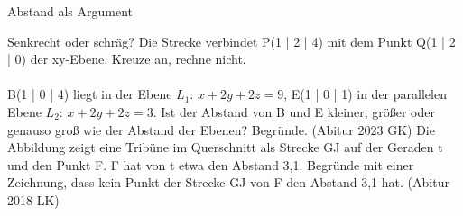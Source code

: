 \setcounter{aufgabe}{15}

\begin{aufgabe}{Abstand als Argument}
\begin{teile}
\teil Senkrecht oder schräg? Die Strecke verbindet P(1 | 2 | 4) mit dem Punkt Q(1 | 2 | 0) der xy-Ebene. Kreuze an, rechne nicht. \\  \\ 
\teil B(1 | 0 | 4) liegt in der Ebene $L_1$: $x + 2y + 2z = 9$, E(1 | 0 | 1) in der parallelen Ebene $L_2$: $x + 2y + 2z = 3$. Ist der Abstand von B und E kleiner, größer oder genauso groß wie der Abstand der Ebenen? Begründe. \hfill (Abitur 2023 GK)
\teil Die Abbildung zeigt eine Tribüne im Querschnitt als Strecke GJ auf der Geraden t und den Punkt F. F hat von t etwa den Abstand 3,1. Begründe mit einer Zeichnung, dass kein Punkt der Strecke GJ von F den Abstand 3,1 hat. \hfill (Abitur 2018 LK)


\end{teile}
\end{aufgabe}
